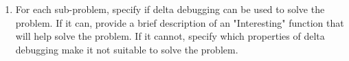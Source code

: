\documentclass{report}
\newif\ifkey
\newcommand{\answerlong}[1]{\ifkey\color{red}\textbf{#1}\color{black}\else\vspace{0.5in}\fi\xspace}
\newcommand*{\pts}[1]{\addtocounter{points}{#1}(#1pt)}
\begin{document}
\begin{spacing}{1.4}
\begin{enumerate}[leftmargin=*]


  \item For each sub-problem, specify if delta debugging can be used
    to solve the problem. If it can, provide a brief description of an "Interesting" function that will help solve the problem. If it
    cannot, specify which properties of delta debugging make it not suitable to solve the problem.
    \begin{enumerate}


\end{enumerate}
\end{enumerate}
\end{spacing}
\end{document}
